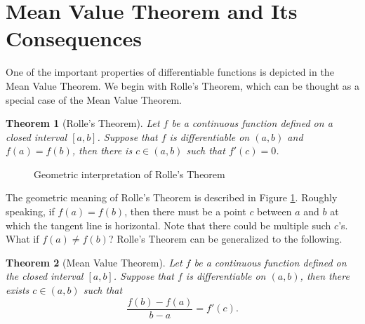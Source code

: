 \documentclass[12pt,letterpaper]{book}
\def\red{\textcolor{red}}
\numberwithin{equation}{section}
\newtheorem{thm}{\textbf{Theorem}}[section]
\theoremstyle{definition}
\begin{document}
\section{Mean Value Theorem and Its Consequences}

One of the important properties of differentiable functions is depicted in the Mean Value Theorem. We begin with Rolle's Theorem, which can be thought as a special case of the Mean Value Theorem.

\begin{thm}[Rolle's Theorem]
Let $f$ be a continuous function defined on a closed interval $[a,b]$. Suppose that $f$ is differentiable on $(a,b)$ and $f(a)=f(b)$, then there is $c\in (a,b)$ such that $f'(c)=0$.
\end{thm}

\begin{figure}[h]
\begin{center}
\end{center}
\caption{Geometric interpretation of Rolle's Theorem}
\label{Rolle}
\end{figure}

The geometric meaning of Rolle's Theorem is described in Figure \ref{Rolle}. Roughly speaking, if $f(a)=f(b)$, then there must be a point $c$ between $a$ and $b$ at which the tangent line is horizontal. Note that there could be multiple such $c$'s. What if $f(a)\neq f(b)$? Rolle's Theorem can be generalized to the following.

\begin{thm}[Mean Value Theorem]
Let $f$ be a continuous function defined on the closed interval $[a,b]$. Suppose that $f$ is differentiable on $(a,b)$, then there exists $c\in (a,b)$ such that
\begin{equation}\label{mean value eq} \frac{f(b)-f(a)}{b-a}=f'(c). \end{equation}
\end{thm}
\end{document}
